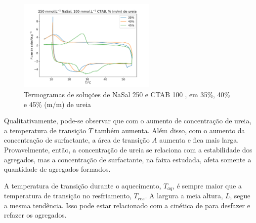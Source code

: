 		\begin{figure}[H]
			\centering
			\includegraphics[width=0.60\textwidth]{./imagens/dsc/NaSal250}
			\caption{Termogramas de soluções de NaSal 250\mM{} e CTAB 100 \mM{}, em 35\%, 40\% e 45\% (m/m) de ureia}
			\label{fig:DSC_NaSal250}
		\end{figure}
%	
%	
%

			
		
		Qualitativamente, pode-se observar que com o aumento de concentração de ureia, a temperatura de transição $T$ também aumenta. Além disso, com o aumento da concentração de surfactante, a área de transição $A$ aumenta e fica mais larga. Provavelmente, então, a concentração de ureia se relaciona com a estabilidade dos agregados, mas a concentração de surfactante, na faixa estudada, afeta somente a quantidade de agregados formados. 
		
		A temperatura de transição durante o aquecimento, $T_{aq}$, é sempre maior que a temperatura de transição no resfriamento, $T_{res}$. A largura a meia altura, $L$, segue a mesma tendência. Isso pode estar relacionado com a cinética de para desfazer e refazer os agregados. 
		
